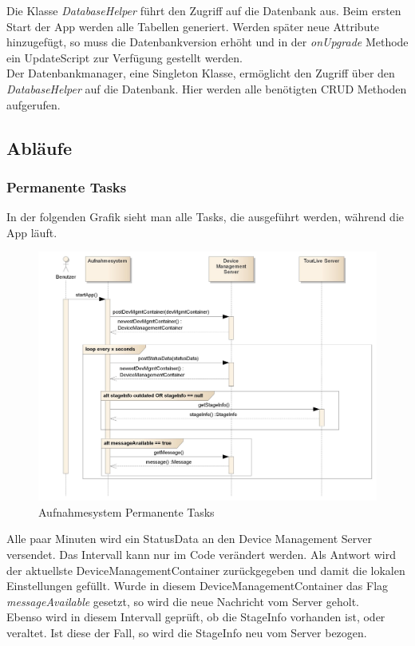 Die Klasse \textit{DatabaseHelper} führt den Zugriff auf die Datenbank aus. Beim ersten Start der App werden alle Tabellen generiert. Werden später neue Attribute hinzugefügt, so muss die Datenbankversion erhöht und in der \textit{onUpgrade} Methode ein UpdateScript zur Verfügung gestellt werden.\\

Der Datenbankmanager, eine Singleton Klasse, ermöglicht den Zugriff über den \textit{DatabaseHelper} auf die Datenbank. Hier werden alle benötigten CRUD Methoden aufgerufen.

\subsection{Abläufe}

\subsubsection{Permanente Tasks}
In der folgenden Grafik sieht man alle Tasks, die ausgeführt werden, während die App läuft. 
\begin{figure}[H]
	\centering
	\includegraphics[width=150mm]{images/android/permanent_taskes.jpg}
	\caption{Aufnahmesystem Permanente Tasks}
\end{figure}
Alle paar Minuten wird ein StatusData an den Device Management Server versendet. Das Intervall kann nur im Code verändert werden. Als Antwort wird der aktuellste DeviceManagementContainer zurückgegeben und damit die lokalen Einstellungen gefüllt. Wurde in diesem DeviceManagementContainer das Flag \textit{messageAvailable} gesetzt, so wird die neue Nachricht vom Server geholt.\\
Ebenso wird in diesem Intervall geprüft, ob die StageInfo vorhanden ist, oder veraltet. Ist diese der Fall, so wird die StageInfo neu vom Server bezogen.

